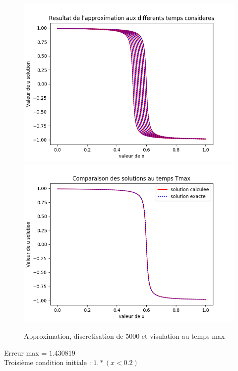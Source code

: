 \documentclass[12pt]{article}
\begin{document}
 \begin{figure}[H]
	\centering
	\includegraphics[scale=0.45]{1D_c1_5000_init2.png}
	\includegraphics[scale=0.45]{Temp_max_c1_5000_s1_i2.png}
	\caption{Approximation, discretisation de 5000 et visulation au temps max}
	\label{1D}
	\end{figure}
Erreur max = $1.430819$
\\Troisième condition initiale : $1.*(x<0.2)$
\end{document}
